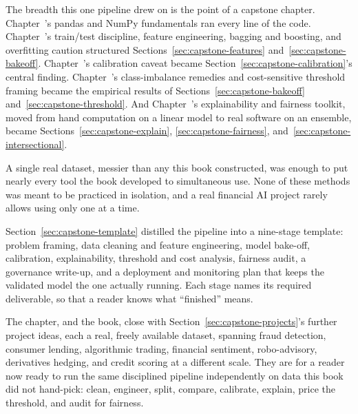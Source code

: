 \documentclass[../ai_in_finance]{subfiles}
\begin{document}
The breadth this one pipeline drew on is the point of a capstone chapter. Chapter~'s pandas and NumPy fundamentals ran every line of the code. Chapter~'s train/test discipline, feature engineering, bagging and boosting, and overfitting caution structured Sections~\ref{sec:capstone-features} and~\ref{sec:capstone-bakeoff}. Chapter~'s calibration caveat became Section~\ref{sec:capstone-calibration}'s central finding. Chapter~'s class-imbalance remedies and cost-sensitive threshold framing became the empirical results of Sections~\ref{sec:capstone-bakeoff} and~\ref{sec:capstone-threshold}. And Chapter~'s explainability and fairness toolkit, moved from hand computation on a linear model to real software on an ensemble, became Sections~\ref{sec:capstone-explain}, \ref{sec:capstone-fairness}, and~\ref{sec:capstone-intersectional}.

A single real dataset, messier than any this book constructed, was enough to put nearly every tool the book developed to simultaneous use. None of these methods was meant to be practiced in isolation, and a real financial AI project rarely allows using only one at a time.

Section~\ref{sec:capstone-template} distilled the pipeline into a nine-stage template: problem framing, data cleaning and feature engineering, model bake-off, calibration, explainability, threshold and cost analysis, fairness audit, a governance write-up, and a deployment and monitoring plan that keeps the validated model the one actually running. Each stage names its required deliverable, so that a reader knows what ``finished'' means.

The chapter, and the book, close with Section~\ref{sec:capstone-projects}'s further project ideas, each a real, freely available dataset, spanning fraud detection, consumer lending, algorithmic trading, financial sentiment, robo-advisory, derivatives hedging, and credit scoring at a different scale. They are for a reader now ready to run the same disciplined pipeline independently on data this book did not hand-pick: clean, engineer, split, compare, calibrate, explain, price the threshold, and audit for fairness.

\end{document}
